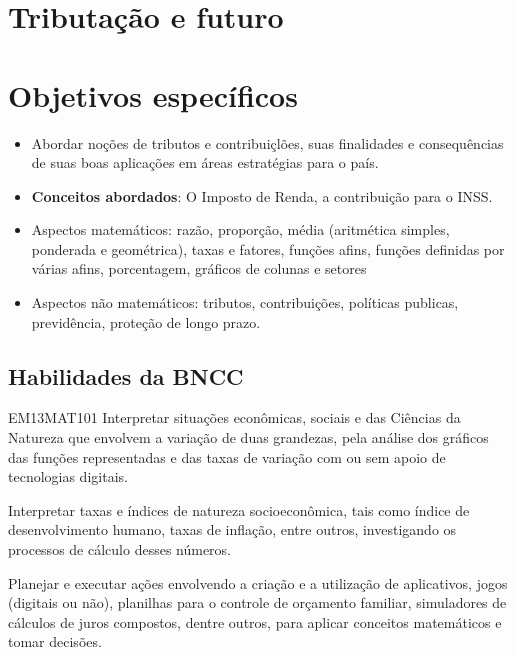 \begin{paginatexto}\raggedcolumns
\section*{Tributação e futuro}
\section*{Objetivos específicos}
\begin{itemize}
\item Abordar noções de tributos e contribuiçlões, suas finalidades e consequências de suas boas aplicações em áreas estratégias para o país.

\item \textbf{Conceitos abordados}: O Imposto de Renda, a contribuição para o INSS.

\item Aspectos matemáticos: razão, proporção, média (aritmética simples, ponderada e geométrica), taxas e fatores, funções afins, funções definidas por várias afins, porcentagem, gráficos de colunas e setores

\item Aspectos não matemáticos: tributos, contribuições, políticas publicas, previdência, proteção de longo prazo.
\end{itemize}

\subsection{Habilidades da BNCC}

\begin{habilities}{EM13MAT101}
 Interpretar situações econômicas, sociais e das Ciências da Natureza
que envolvem a variação de duas grandezas, pela análise dos gráficos das funções representadas e das taxas de variação com ou sem apoio de tecnologias digitais.


Interpretar taxas e índices de natureza socioeconômica, tais como índice de desenvolvimento humano, taxas de inflação, entre outros, investigando os processos de cálculo desses números.

Planejar e executar ações envolvendo a criação e a utilização de aplicativos, jogos (digitais ou não), planilhas para o controle de orçamento familiar, simuladores de cálculos de juros compostos, dentre outros, para aplicar conceitos matemáticos e tomar decisões. 


\end{habilities}
\end{paginatexto}
